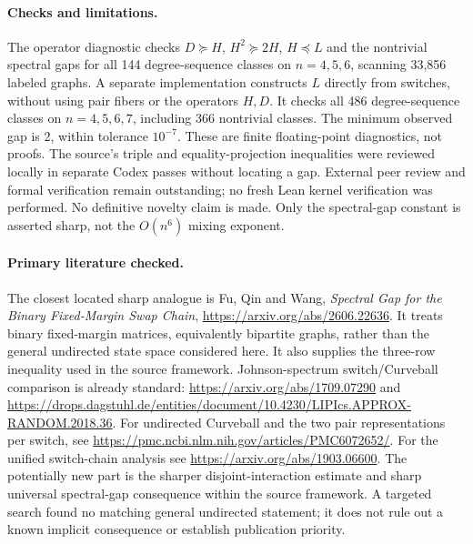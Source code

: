 \documentclass[11pt]{article}
\begin{document}
\paragraph{Checks and limitations.}
The operator diagnostic checks $D\succeq H$, $H^2\succeq2H$, $H\preceq L$
and the nontrivial spectral gaps for all 144 degree-sequence classes on
$n=4,5,6$, scanning 33,856 labeled graphs. A separate implementation
constructs $L$ directly from switches, without using pair fibers or the
operators $H,D$. It checks all 486 degree-sequence classes on $n=4,5,6,7$,
including 366 nontrivial classes. The minimum observed gap is 2, within
tolerance $10^{-7}$. These are finite floating-point diagnostics, not proofs.
The source's triple and equality-projection inequalities were reviewed
locally in separate Codex passes without locating a gap. External peer
review and formal verification remain outstanding; no fresh Lean kernel
verification was performed. No definitive novelty claim is made. Only
the spectral-gap constant is asserted sharp, not the $O(n^6)$ mixing exponent.

\paragraph{Primary literature checked.}
The closest located sharp analogue is Fu, Qin and Wang,
\emph{Spectral Gap for the Binary Fixed-Margin Swap Chain},
\url{https://arxiv.org/abs/2606.22636}. It treats binary fixed-margin
matrices, equivalently bipartite graphs, rather than the general undirected
state space considered here. It also supplies the three-row inequality
used in the source framework.
Johnson-spectrum switch/Curveball comparison is already standard:
\url{https://arxiv.org/abs/1709.07290} and
\url{https://drops.dagstuhl.de/entities/document/10.4230/LIPIcs.APPROX-RANDOM.2018.36}.
For undirected Curveball and the two pair representations per switch,
see \url{https://pmc.ncbi.nlm.nih.gov/articles/PMC6072652/}.
For the unified switch-chain analysis see
\url{https://arxiv.org/abs/1903.06600}.
The potentially new part is the sharper disjoint-interaction estimate
and sharp universal spectral-gap consequence within the source framework.
A targeted search found no matching general undirected statement; it does
not rule out a known implicit consequence or establish publication priority.
\clearpage
\appendix
\end{document}
